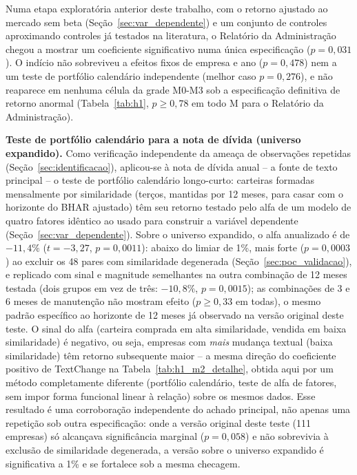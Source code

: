 \documentclass[a4paper,12pt]{report}
\begin{document}
Numa etapa exploratória anterior deste trabalho, com o retorno ajustado ao mercado sem beta (Seção~\ref{sec:var_dependente}) e um conjunto de controles aproximando controles já testados na literatura, o Relatório da Administração chegou a mostrar um coeficiente significativo numa única especificação ($p=0{,}031$). O indício não sobreviveu a efeitos fixos de empresa e ano ($p=0{,}478$) nem a um teste de portfólio calendário independente (melhor caso $p=0{,}276$), e não reaparece em nenhuma célula da grade M0-M3 sob a especificação definitiva de retorno anormal (Tabela~\ref{tab:h1}, $p \geq 0{,}78$ em todo M para o Relatório da Administração).

\textbf{Teste de portfólio calendário para a nota de dívida (universo expandido).} Como verificação independente da ameaça de observações repetidas (Seção~\ref{sec:identificacao}), aplicou-se à nota de dívida anual -- a fonte de texto principal -- o teste de portfólio calendário longo-curto: carteiras formadas mensalmente por similaridade (terços, mantidas por 12 meses, para casar com o horizonte do BHAR ajustado) têm seu retorno testado pelo alfa de um modelo de quatro fatores idêntico ao usado para construir a variável dependente (Seção~\ref{sec:var_dependente}). Sobre o universo expandido, o alfa anualizado é de $-11{,}4\%$ ($t=-3{,}27$, $p=0{,}0011$): abaixo do limiar de 1\%, mais forte ($p=0{,}0003$) ao excluir os 48 pares com similaridade degenerada (Seção~\ref{sec:poc_validacao}), e replicado com sinal e magnitude semelhantes na outra combinação de 12 meses testada (dois grupos em vez de três: $-10{,}8\%$, $p=0{,}0015$); as combinações de 3 e 6 meses de manutenção não mostram efeito ($p \geq 0{,}33$ em todas), o mesmo padrão específico ao horizonte de 12 meses já observado na versão original deste teste. O sinal do alfa (carteira comprada em alta similaridade, vendida em baixa similaridade) é negativo, ou seja, empresas com \emph{mais} mudança textual (baixa similaridade) têm retorno subsequente maior -- a mesma direção do coeficiente positivo de TextChange na Tabela~\ref{tab:h1_m2_detalhe}, obtida aqui por um método completamente diferente (portfólio calendário, teste de alfa de fatores, sem impor forma funcional linear à relação) sobre os mesmos dados. Esse resultado é uma corroboração independente do achado principal, não apenas uma repetição sob outra especificação: onde a versão original deste teste (111 empresas) só alcançava significância marginal ($p=0{,}058$) e não sobrevivia à exclusão de similaridade degenerada, a versão sobre o universo expandido é significativa a 1\% e se fortalece sob a mesma checagem.
\end{document}
